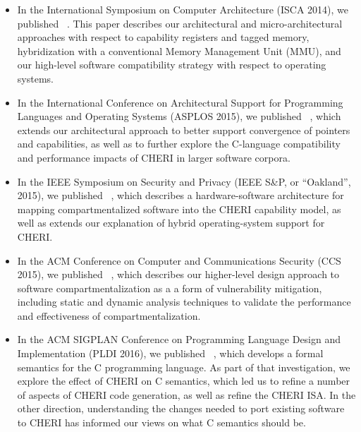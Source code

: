 \begin{itemize}
\item In the International Symposium on Computer Architecture (ISCA 2014), we
  published ~\cite{woodruff:cheriisca2014}.
  This paper describes our architectural and micro-architectural approaches
  with respect to capability registers and tagged memory, hybridization with a
  conventional Memory Management Unit (MMU), and our high-level software
  compatibility strategy with respect to operating systems.

\item In the International Conference on Architectural Support for Programming
  Languages and Operating Systems (ASPLOS 2015), we published
  ~\cite{ChisnallCPDP11}, which extends our architectural approach to
  better support convergence of pointers and capabilities, as well as to
  further explore the C-language compatibility and performance impacts of
  CHERI in larger software corpora.

\item In the IEEE Symposium on Security and Privacy (IEEE S\&P, or
  ``Oakland'', 2015), we
  published ~\cite{watson15:cheri}, which
  describes a hardware-software architecture for mapping compartmentalized
  software into the CHERI capability model, as well as extends our explanation
  of hybrid operating-system support for CHERI.

\item In the ACM Conference on Computer and Communications Security (CCS
  2015), we published ~\cite{gudka15:soaap},
  which describes our higher-level design
  approach to software compartmentalization as a a form of vulnerability
  mitigation, including static and dynamic analysis techniques to validate the
  performance and effectiveness of compartmentalization.

\item In the ACM SIGPLAN Conference on Programming Language Design and
  Implementation (PLDI 2016), we published
  ~\cite{Cerberus-PLDI16}, which develops a
  formal semantics for the C programming language.
  As part of that investigation, we explore the effect of CHERI on C
  semantics, which led us to refine a number of aspects of CHERI code
  generation, as well as refine the CHERI ISA.  In the other
  direction, understanding the changes needed to port existing
  software to CHERI has informed our views on what C semantics should be.


\end{itemize}
